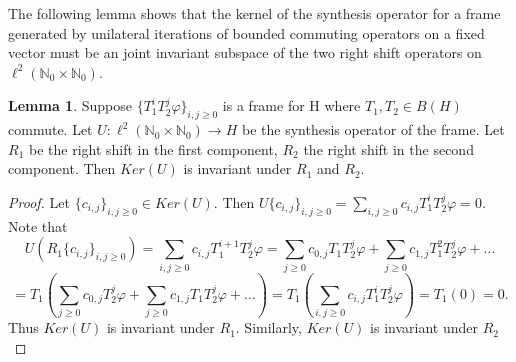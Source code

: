 \documentclass[12pt,reqno]{amsart}
\theoremstyle{definition}
\theoremstyle{definition}
\newtheorem{lemma}[theorem]{Lemma}
\newtheorem{definition}[theorem]{Definition}
\numberwithin{equation}{section}
\begin{document}
 
 The following lemma shows that the kernel of the synthesis operator for a frame generated by unilateral iterations of bounded commuting operators on a fixed vector must be an joint invariant subspace of the two right shift operators on $\ell^{2}(\mathbb{N}_0 \times \mathbb{N}_0)$.
\begin{lemma}
Suppose $\{T_1^iT_2^j\varphi\}_{i,j \geq 0}$ is a frame for H where $T_1, T_2  \in B(H)$ commute. Let $U: \ell^{2}(\mathbb{N}_0 \times \mathbb{N}_0) \to H$ be the synthesis operator of the frame. Let $R_1$ be the right shift in the first component, $R_2$ the right shift in the second component. Then $Ker(U)$ is invariant under $R_1$ and $R_2$.
\end{lemma}
\begin{proof}
Let $\{c_{i, j}\}_{i, j \geq 0} \in Ker(U)$. Then $U \{c_{i, j}\}_{i, j \geq 0} =  \underset{i,j \geq 0}{\sum} c_{i,j} T_1^iT_2^j\varphi = 0$.
\newline 
Note that
\begin{displaymath}
U (R_1 \{c_{i, j}\}_{i, j \geq 0}) =  \underset{i,j \geq 0}{\sum} c_{i,j} T_1^{i+1}T_2^j\varphi =  \underset{j \geq 0}{\sum} c_{0,j} T_1T_2^j\varphi + \underset{j \geq 0}{\sum} c_{1,j} T_1^{2}T_2^j\varphi + \ldots
\end{displaymath}
\begin{displaymath}
= T_1(  \underset{j \geq 0}{\sum} c_{0,j} T_2^j\varphi + \underset{j \geq 0}{\sum} c_{1,j} T_1T_2^j\varphi + \ldots) = T_1( \underset{i,j \geq 0}{\sum} c_{i,j} T_1^iT_2^j\varphi) = T_1(0) = 0.
\end{displaymath}
Thus $Ker(U)$ is invariant under $R_1$. Similarly, $Ker(U)$ is invariant under $R_2$
\end{proof}

\end{document}
